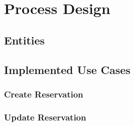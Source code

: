 \chapter{Process Design}
\label{ch:Process Design}

\section{Entities}
\label{ch:Process Design:sec:Entities}


\section{Implemented Use Cases}
\label{ch:Process Design:sec:Implemented Use Cases}


\subsection{Create Reservation}
\label{ch:Process Design:sec:Implemented Use Cases:ssec:Create Reservation}


\subsection{Update Reservation}
\label{ch:Process Design:sec:Implemented Use Cases:ssec:Update Reservation}

